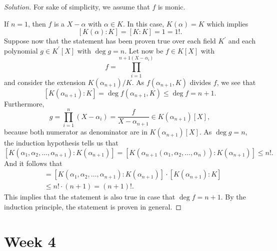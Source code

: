 \documentclass[a4paper,10pt,reqno]{amsart}
\newenvironment{sol}
  {\renewcommand\qedsymbol{$\blacksquare$}\begin{proof}[Solution]}
  {\end{proof}}
\begin{document}
\begin{sol}

    For sake of simplicity, we assume that $f$ is monic.
    
    If $n = 1$, then $f$ is a  $X - \alpha$ with $\alpha \in K$. In this case, $K(\alpha) = K$ which implies
    \[
    [K(\alpha):K] = [K:K] = 1 = 1!.
    \]
    Suppose now that the statement has been proven true over each field $K^{\prime}$ and each polynomial $g \in K^{\prime}[X]$ with $\deg g = n$. Let now be $f \in K[X]$ with
    \[
    f = \prod_{i=1}^{n+1 (X - \alpha_i)}
    \]
    and consider the extension $K(\alpha_{n+1})/K$. As $f(\alpha_{n+1},K)$ divides $f$, we see that
    \[
    [K(\alpha_{n+1}):K] = \deg f(\alpha_{n+1},K) \leq \deg f = n+1.
    \]
    Furthermore,
    \[
    g = \prod_{i=1}^{n} (X-\alpha_i) = \frac{f}{X-\alpha_{n+1}} \in K(\alpha_{n+1})[X],
    \]
    because both numerator as denominator are in $K(\alpha_{n+1})[X]$. As $\deg g = n$, the induction hypothesis tells us that
    \[
    [K(\alpha_1,\alpha_2, \ldots, \alpha_{n+1}):K(\alpha_{n+1})] = [K(\alpha_{n+1}(\alpha_1,\alpha_2, \ldots, \alpha_n)):K(\alpha_{n+1})] \leq n!.
    \]
    And it follows that
    \begin{align*}
    [K(\alpha_1,\alpha_2, \ldots, \alpha_{n+1}):K] & = [K(\alpha_1,\alpha_2, \ldots, \alpha_{n+1}):K(\alpha_{n+1})] \cdot [K(\alpha_{n+1}):K] \\
    & \leq n! \cdot (n+1) = (n+1)!.
    \end{align*}
    This implies that the statement is also true in case that $\deg f = n+1$. By the induction principle, the statement is proven in general.
\end{sol}

\newpage
\section{Week 4}
\end{document}
